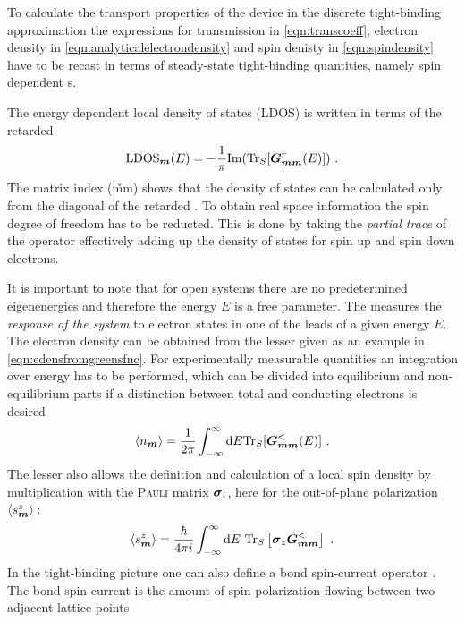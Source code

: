 To calculate the transport properties of the device in the discrete tight-binding approximation the expressions for transmission in \cref{eqn:transcoeff}, electron density in \cref{eqn:analyticalelectrondensity} and spin denisty in \cref{eqn:spindensity} have to be recast in terms of steady-state tight-binding quantities, namely spin dependent \gfnc s.\par
The energy dependent local density of states (LDOS) is written in terms of the retarded \gfnc{} \cite{AnLunNik2008}
\begin{align}
\text{LDOS}_{\boldsymbol{m}}(E)=-\frac{1}{\pi} \text{Im}(\text{Tr}_S[\boldsymbol{G}_{\boldsymbol{mm}}^r(E)]) \ .
\label{eqn:ldos}
\end{align}
The matrix index (\v{mm}) shows that the density of states can be calculated only from the diagonal of the retarded \gfnc{}.
To obtain real space information the spin degree of freedom has to be reducted. This is done by taking the \emph{partial trace} \cite{Jacobs} of the operator effectively adding up the density of states for spin up and spin down electrons.\par
It is important to note that for open systems there are no predetermined eigenenergies and therefore the energy $E$ is a free parameter. The \gfnc{} measures the \emph{response of the system} to electron states in one of the leads of a given energy $E$. The electron density can be obtained from the lesser \gfnc{} given as an example in \cref{eqn:edensfromgreensfnc}. For experimentally measurable quantities an integration over energy has to be performed, which can be divided into equilibrium and non-equilibrium parts if a distinction between total and conducting electrons is desired
\begin{align}
	\expv{n_{\v{m}}} = \frac{1}{2\pi} \int_{-\infty}^{\infty}\text{d}E\text{Tr}_S[\mat{G}_{\v{mm}}^<(E)] \ .
	\label{eqn:gfncdensity}
\end{align}
The lesser \gfnc{} also allows the definition and calculation  of a local spin density by multiplication with the \textsc{Pauli} matrix $\boldsymbol{\sigma}_i$, here for the out-of-plane polarization $\left< s^z_{\boldsymbol{m}} \right>$\,\cite{Wimmer2009Thesis}:
\begin{align}
\left< s^z_{\boldsymbol{m}} \right> = \frac{\hbar}{4 \pi i} \int^{\infty}_{-\infty}\text{d}E\text{ Tr}_S\left[\boldsymbol{\sigma}_z\boldsymbol{G}^<_{\boldsymbol{mm}}\right]\ .
\label{eqn:gfncspindensity}
\end{align}
In the tight-binding picture one can also define a bond spin-current operator \cite{EPL.80.47001}. The bond spin current is the amount of spin polarization flowing between two adjacent lattice points

